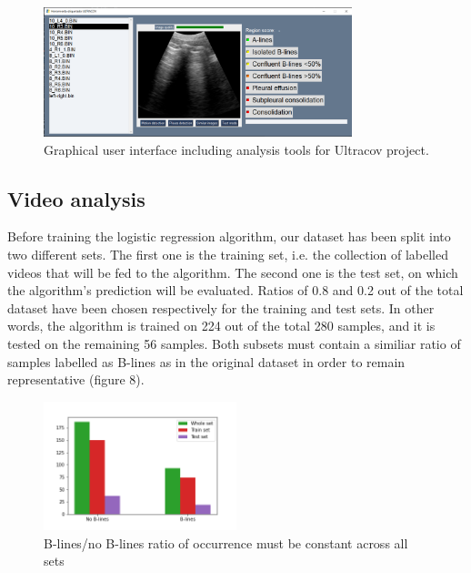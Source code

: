 \documentclass[11pt]{article} %
\begin{document}
	\begin{figure}
	\centering
	\includegraphics[width=0.8\textwidth]{figuras/ultracov_GUI.png}
	\caption{Graphical user interface including analysis tools for Ultracov project.}
	\end{figure}
	
	
\subsection{Video analysis}

	Before training the logistic regression algorithm, our dataset has been split into two different sets. The first one is the training set, i.e. the collection of labelled videos that will be fed to the algorithm. The second one is the test set, on which the algorithm's prediction will be evaluated. Ratios of 0.8 and 0.2  out of the total dataset have been chosen respectively for the training and test sets. In other words, the algorithm is trained on 224 out of the total 280 samples, and it is tested on the remaining 56 samples. Both subsets must contain a similiar ratio of samples labelled as B-lines as in the original dataset in order to remain representative (figure 8). 
	
	\begin{figure}
	\centering
	\includegraphics[width=0.5\textwidth]{figuras/bline_ratio.png}
	\caption{B-lines/no B-lines ratio of occurrence must be constant across all 		sets}
	\end{figure}
\end{document}
